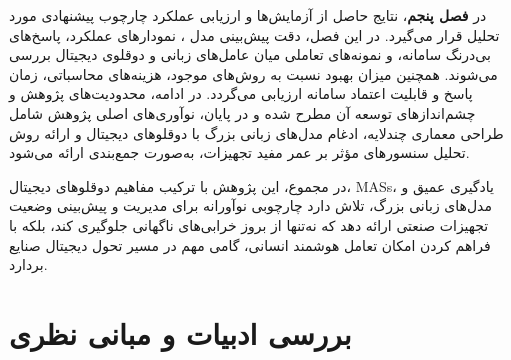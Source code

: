 \documentclass[a4paper,fleqn]{report}
\begin{document}
در \textbf{فصل پنجم}، نتایج حاصل از آزمایش‌ها و ارزیابی عملکرد چارچوب پیشنهادی مورد تحلیل قرار می‌گیرد. در این فصل، دقت پیش‌بینی مدل ، نمودارهای عملکرد، پاسخ‌های بی‌درنگ سامانه، و نمونه‌های تعاملی میان عامل‌های زبانی و دوقلوی دیجیتال بررسی می‌شوند. همچنین میزان بهبود نسبت به روش‌های موجود، هزینه‌های محاسباتی، زمان پاسخ و قابلیت اعتماد سامانه ارزیابی می‌گردد. در ادامه، محدودیت‌های پژوهش و چشم‌اندازهای توسعه آن مطرح شده و در پایان، نوآوری‌های اصلی پژوهش شامل طراحی معماری چندلایه، ادغام مدل‌های زبانی بزرگ با دوقلوهای دیجیتال و ارائه روش تحلیل سنسورهای مؤثر بر عمر مفید تجهیزات، به‌صورت جمع‌بندی ارائه می‌شود.


\noindent
در مجموع، این پژوهش با ترکیب مفاهیم دوقلوهای دیجیتال، \glspl{MAS}، یادگیری عمیق و مدل‌های زبانی بزرگ، تلاش دارد چارچوبی نوآورانه برای مدیریت و پیش‌بینی وضعیت تجهیزات صنعتی ارائه دهد که نه‌تنها از بروز خرابی‌های ناگهانی جلوگیری کند، بلکه با فراهم کردن امکان تعامل هوشمند انسانی، گامی مهم در مسیر تحول دیجیتال صنایع بردارد.


%
%
%
%
%
%
%
%
%


\chapter{بررسی ادبیات و مبانی نظری}\label{chap:review}
\end{document}
